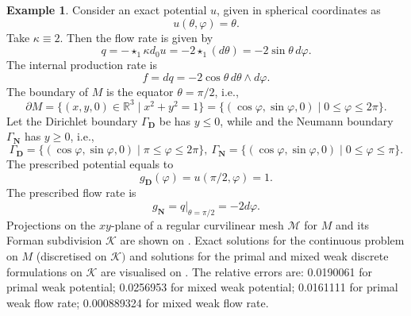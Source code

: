 \documentclass{elsarticle}
\theoremstyle{definition}
\newtheorem{example}[theorem]{Example}
\newcommand{\R}{\mathbb{R}}
\newcommand{\set}[2]{\{#1 \mid #2\}}
\newcommand{\restrict}[2]{\left.#1\right|_{#2}}
\newcommand{\Dirichlet}{\mathbf{D}}
\newcommand{\Neumann}{\mathbf{N}}
\begin{document}
\begin{example}
  Consider an exact potential $u$, given in spherical coordinates as
  \begin{equation}
    u(\theta, \varphi) = \theta.
  \end{equation}
  Take $\kappa \equiv 2$.
  Then the flow rate is given by
  \begin{equation}
    \label{eq:simulations/hemisphere/flow_rate}
    q
    = - \star_1 \kappa d_0 u
    = - 2 \star_1(d \theta)
    = - 2 \sin \theta\, d \varphi.
  \end{equation}
  The internal production rate is
  \begin{equation}
    f
    = d q
    = - 2 \cos \theta\, d \theta \wedge d \varphi.
  \end{equation}
  The boundary of $M$ is the equator $\theta = \pi / 2$, i.e.,
  \begin{equation}
    \partial M = \set{(x, y, 0) \in \R^3}{x^2 + y^2 = 1} = \set{(\cos \varphi, \sin \varphi, 0)}{0 \leq \varphi \leq 2 \pi}.
  \end{equation}
  Let the Dirichlet boundary $\Gamma_\Dirichlet$ be has $y \leq 0$, while and the Neumann boundary $\Gamma_\Neumann$ has $y \geq 0$, i.e.,
  \begin{equation}
    \Gamma_\Dirichlet
    = \set{(\cos \varphi, \sin \varphi, 0)}
    {\pi \leq \varphi \leq 2 \pi},\
    \Gamma_\Neumann = \set{(\cos \varphi, \sin \varphi, 0)}{0 \leq \varphi \leq \pi}.
  \end{equation}
  The prescribed potential equals to
  \begin{equation}
     g_\Dirichlet(\varphi) = u(\pi / 2, \varphi) = 1.
  \end{equation}
  The prescribed flow rate is
  \begin{equation}
    g_\Neumann = \restrict{q}{\theta = \pi / 2} = -2 d \varphi.
  \end{equation}
  Projections on the $xy$-plane of a regular curvilinear mesh $\mathcal{M}$ for $M$ and its Forman subdivision $\mathcal{K}$ are shown on .
  Exact solutions for the continuous problem on $M$ (discretised on $\mathcal{K})$ and solutions for the primal and mixed weak discrete formulations on $\mathcal{K}$ are visualised on .
  The relative errors are:
  0.0190061
   for primal weak potential;
  0.0256953
   for mixed weak potential;
  0.0161111
   for primal weak flow rate;
  0.000889324
   for mixed weak flow rate.
\end{example}
\end{document}
